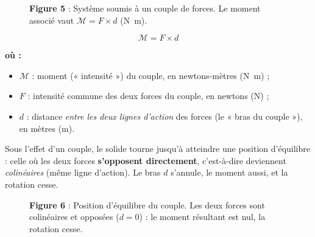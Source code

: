 \documentclass[11pt,a4paper]{article}
\newenvironment{ou}{%
  \par\smallskip\noindent\textbf{où :}\nopagebreak
  \begin{itemize}[leftmargin=1.8em,topsep=2pt,itemsep=1.5pt,parsep=0pt]}%
  {\end{itemize}}
\newcommand{\vv}[1]{\vec{#1}}
\newcommand{\Mom}{\mathcal{M}}      %
\begin{document}
\begin{figure}[h]
\centering
{}
\caption*{\small\textbf{\textcolor{primary}{Figure 5}} : Système soumis à un couple de forces. Le moment associé vaut $\Mom = F\times d$ (\si{\newton\metre}).}
\end{figure}

\begin{formule}
\[
\boxed{\;\Mom = F\times d\;}
\]
\begin{ou}
  \item $\Mom$ : moment (« intensité ») du couple, en newtons-mètres (\si{\newton\metre}) ;
  \item $F$ : intensité commune des deux forces du couple, en newtons (\si{\newton}) ;
  \item $d$ : distance \emph{entre les deux lignes d'action} des forces (le « bras du couple »), en mètres (\si{\metre}).
\end{ou}
\end{formule}

Sous l'effet d'un couple, le solide tourne jusqu'à atteindre une position d'équilibre : celle où les
deux forces \textbf{s'opposent directement}, c'est-à-dire deviennent \emph{colinéaires} (même ligne
d'action). Le bras $d$ s'annule, le moment aussi, et la rotation cesse.

\begin{figure}[h]
\centering
{}
\caption*{\small\textbf{\textcolor{primary}{Figure 6}} : Position d'équilibre du couple. Les deux forces sont colinéaires et opposées ($d=0$) : le moment résultant est nul, la rotation cesse.}
\end{figure}
\end{document}
